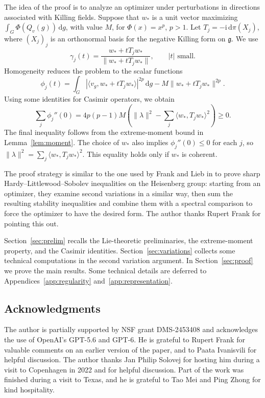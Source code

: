 \documentclass[11pt,reqno]{amsart}
\numberwithin{equation}{section}
\theoremstyle{plain}
\theoremstyle{remark}
\newcommand{\gfrak}{\mathfrak g}
\newcommand{\ii}{\mathrm i}
\newcommand{\dd}{\,\mathrm d}
\newcommand{\norm}[1]{\lVert#1\rVert}
\begin{document}
The idea of the proof is to analyze an optimizer under perturbations in
directions associated with Killing fields.
Suppose that $w_*$ is a unit vector maximizing
$\int_G\Phi(Q_v(g))\dd g$, with value $M$, for $\Phi(x)=x^p$, $p>1$.
Let $T_j=-\ii\,\mathrm d\pi(X_j)$, where $(X_j)_j$ is an orthonormal
basis for the negative Killing form on $\gfrak$. We use
\[
 \gamma_j(t)=\frac{w_*+tT_jw_*}{\norm{w_*+tT_jw_*}},\qquad |t|\text{ small}.
\]
Homogeneity reduces the problem to the scalar functions
\[
 \phi_j(t)=\int_G|\langle v_g,w_*+tT_jw_*\rangle|^{2p}\dd g
              -M\norm{w_*+tT_jw_*}^{2p}.
\]
Using some identities for Casimir operators, we obtain
\[
 \sum_j\phi_j''(0)=4p(p-1)M
 \left(\|\lambda\|^2-\sum_j\langle w_*,T_jw_*\rangle^2\right)\ge 0.
\]
The final inequality follows from the extreme-moment bound in Lemma~\ref{lem:moment}. The choice of $w_*$ also implies
$\phi_j''(0)\le0$ for each $j$, so
$\|\lambda\|^2=\sum_j\langle w_*,T_jw_*\rangle^2$.
This equality holds only if $w_*$ is coherent.

\medskip

The proof strategy is similar to the one used by Frank and Lieb in
\cite{FrankLieb} to prove sharp Hardy--Littlewood--Sobolev inequalities
on the Heisenberg group: starting from an optimizer, they examine second
variations in a similar way, then sum the resulting stability inequalities
and combine them with a spectral comparison to force the optimizer to
have the desired form. The author thanks Rupert Frank for pointing this out.

\medskip

Section~\ref{sec:prelim} recalls the Lie-theoretic preliminaries,
the extreme-moment property, and the Casimir identities.
Section~\ref{sec:variations} collects some technical computations in the second variation argument.
In Section~\ref{sec:proof} we prove the main results.
Some technical details are deferred to Appendices~\ref{app:regularity} and~\ref{app:representation}.

\subsection*{Acknowledgments} The author is partially supported by NSF grant DMS-2453408 and acknowledges the use of OpenAI’s GPT-5.6 and GPT-6. He is grateful to Rupert Frank for valuable comments on an earlier version of the paper, and to Paata Ivanisvili for helpful discussion. The author thanks Jan Philip Solovej for hosting him during a visit to Copenhagen in 2022 and for helpful discussion. Part of the work was finished during a visit to Texas, and he is grateful to Tao Mei and Ping Zhong for kind hospitality.
\end{document}
